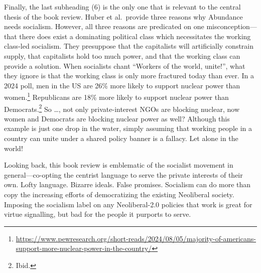 \documentclass[12pt]{article}
\begin{document}
Finally, the last subheading (6) is the only one that is relevant to the central thesis of the book review. Huber et al.\ provide three reasons why Abundance needs socialism. However, all three reasons are predicated on one misconception--- that there does exist a dominating political class which necessitates the working class-led socialism. They presuppose that the capitalists will artificially constrain supply, that capitalists hold too much power, and that the working class can provide a solution. When socialists chant ``Workers of the world, unite!'', what they ignore is that the working class is only more fractured today than ever. In a 2024 poll, men in the US are 26\% more likely to support nuclear power than women.\footnote{\href{https://www.pewresearch.org/short-reads/2024/08/05/majority-of-americans-support-more-nuclear-power-in-the-country/}{https://www.pewresearch.org/short-reads/2024/08/05/majority-of-americans-support-more-nuclear-power-in-the-country/}} Republicans are 18\% more likely to support nuclear power than Democrats.\footnote{Ibid.} So \dots, not only private-interest NGOs are blocking nuclear, now women and Democrats are blocking nuclear power as well? Although this example is just one drop in the water, simply assuming that working people in a country can unite under a shared policy banner is a fallacy. Let alone in the world!

Looking back, this book review is emblematic of the socialist movement in general---co-opting the centrist language to serve the private interests of their own. Lofty language. Bizarre ideals. False promises. Socialism can do more than copy the increasing efforts of democratizing the existing Neoliberal society. Imposing the socialism label on any Neoliberal-2.0 policies that work is great for virtue signalling, but bad for the people it purports to serve.
\end{document}
